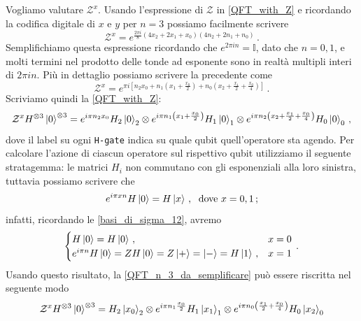 \begin{esempio}
Vogliamo valutare $\mathcal{Z}^x$. Usando l'espressione di $\mathcal{Z}$ in \eqref{QFT_with_Z} e ricordando la codifica digitale di $x$ e $y$ per $n = 3$ possiamo facilmente scrivere
\begin{equation*}
    \mathcal{Z}^x = e^{\frac{2 \pi i}{8} (4 x_2 + 2 x_1 + x_0 ) ( 4 n_2 + 2 n_1 + n_0 ) } \, .
\end{equation*}
Semplifichiamo questa espressione ricordando che $e^{2\pi i n} = \mathbb{I}$, dato che $n = 0,1$, e molti termini nel prodotto delle tonde ad esponente sono in realtà multipli interi di $2 \pi i n$. Più in dettaglio possiamo scrivere la precedente come
\begin{equation*}
    \mathcal{Z}^x = e^{\pi i \left[ n_2 x_0 + n_1 \left( x_1 + \frac{x_0}{2} \right) + n_0 \left( x_2 + \frac{x_1}{2} + \frac{x_0}{4} \right) \right]} \, .
\end{equation*}
Scriviamo quindi la \eqref{QFT_with_Z}:
\begin{equation}\label{QFT_n_3_da_semplificare}
    \mathcal{Z}^x H^{\otimes 3} \ket{0}^{\otimes 3} = e^{i \pi n_2 x_0} H_2 \ket{0}_2 \otimes e^{i \pi n_1 \left( x_1 + \frac{x_0}{2} \right)} H_1 \ket{0}_1 \otimes e^{i \pi n_2 \left( x_2 + \frac{x_1}{2} + \frac{x_0}{4} \right)} H_0\ket{0}_0 \, ,
\end{equation}
dove il label su ogni \texttt{H-gate} indica su quale qubit quell'operatore sta agendo. Per calcolare l'azione di ciascun operatore sul rispettivo qubit utilizziamo il seguente stratagemma: le matrici $H_i$ non commutano con gli esponenziali alla loro sinistra, tuttavia possiamo scrivere che
\begin{equation*}
    e^{i \pi x n} H \ket 0 = H \ket x \, , \; \text{ dove } x = 0, 1 \, ;
\end{equation*}
infatti, ricordando le \eqref{basi_di_sigma_12}, avremo
\begin{equation*}
    \begin{cases}
        H\ket 0 = H \ket 0 \, , & x = 0 \\
        e^{i \pi n} H \ket{0} = Z H \ket{0} = Z \ket{+} = \ket{-} = H \ket{1} \, , &x = 1
    \end{cases} \, .
\end{equation*}
Usando questo risultato, la \eqref{QFT_n_3_da_semplificare} può essere riscritta nel seguente modo 
\begin{align*}
    \mathcal{Z}^xH^{\otimes 3}\ket{0}^{\otimes 3} &= H_2 \ket{x_0}_2 \otimes e^{i\pi n_1 \frac{x_0}{2}} H_1 \ket{x_1}_1 \otimes e^{i \pi n_0 \left( \frac{x_1}{2} + \frac{x_0}{4} \right)} H_0 \ket{x_2}_0 \\

\end{align*}
\end{esempio}
